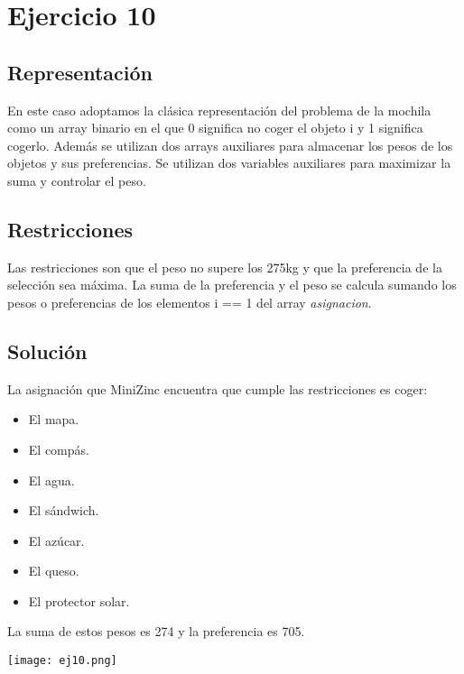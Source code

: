 \section{Ejercicio 10}

\subsection{Representación}
En este caso adoptamos la clásica representación del problema de la mochila como un array binario en el que 0 significa no coger el objeto i y 1 significa cogerlo. Además se utilizan dos arrays auxiliares para almacenar los pesos de los objetos y sus preferencias. Se utilizan dos variables auxiliares para maximizar la suma y controlar el peso.

\subsection{Restricciones}
Las restricciones son que el peso no supere los 275kg y que la preferencia de la selección sea máxima. La suma de la preferencia y el peso se calcula sumando los pesos o preferencias de los elementos i == 1 del array \emph{asignacion}.

\subsection{Solución}
La asignación que MiniZinc encuentra que cumple las restricciones es coger:
\begin{itemize}
   \item El mapa.
   \item El compás.
   \item El agua.
   \item El sándwich.
   \item El azúcar.
   \item El queso.
   \item El protector solar.
\end{itemize}
La suma de estos pesos es 274 y la preferencia es 705.

\texttt{[image: ej10.png]}
